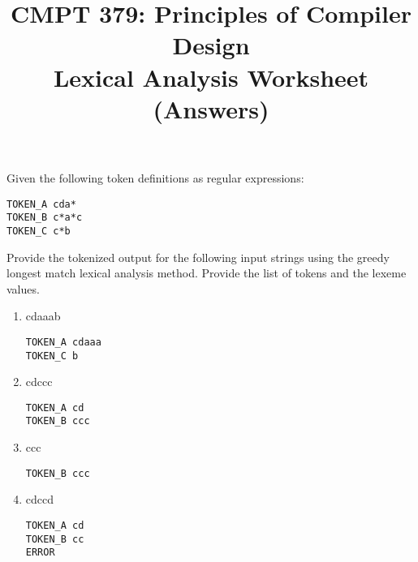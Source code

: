 \documentclass[10pt, oneside, letterpaper]{article}
\title{CMPT 379: Principles of Compiler Design \\\medskip \Large Lexical Analysis Worksheet (Answers)}
\author{}
\date{}
\begin{document}
	\maketitle
	
	Given the following token definitions as regular expressions:
\begin{lstlisting}
TOKEN_A cda*
TOKEN_B c*a*c
TOKEN_C c*b
\end{lstlisting}
			
	Provide the tokenized output for the following input strings using the greedy longest match lexical analysis method. Provide the list of tokens and the lexeme values.
	
	\begin{enumerate}
		\item cdaaab
\begin{lstlisting}
TOKEN_A cdaaa
TOKEN_C b
\end{lstlisting}
		
		\item cdccc
\begin{lstlisting}
TOKEN_A cd
TOKEN_B ccc
\end{lstlisting}
		
		\item ccc
\begin{lstlisting}
TOKEN_B ccc
\end{lstlisting}
		
		\item cdccd
\begin{lstlisting}
TOKEN_A cd
TOKEN_B cc
ERROR
\end{lstlisting}

	\end{enumerate}
		
	\vspace{2cm}
\end{document}
